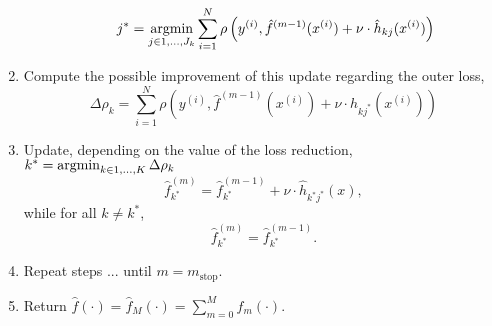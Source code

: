 \begin{algorithm}
\begin{enumerate}
\begin{itemize}
                \begin{equation}
                    j^*=\operatorname*{argmin}_{j\in 1,\ldots,J_k}\sum_{i=1}^N\rho\left(y^{(i)}, \hat{f}^{(m-1)}(x^{(i)}) + \nu \cdot \hat{h}_{kj}(x^{(i)}) \right)
                \end{equation}
        \end{itemize}
    \item Compute the possible improvement of this update regarding the outer loss,
        \begin{equation}
            \Delta\rho_k=\sum_{i=1}^N\rho\left(y^{(i)}, \hat{f}^{(m-1)}(x^{(i)}) + \nu \cdot \hat{h}_{kj^*}(x^{(i)}) \right)
        \end{equation}
    \item Update, depending on the value of the loss reduction, $k^*=\operatorname*{argmin}_{k\in1,\ldots,K}\Delta\rho_k$
        \begin{equation}
            \hat{f}^{(m)}_{k^*}=\hat{f}^{(m-1)}_{k^*}+\nu\cdot\hat{h}_{k^*j^*}(x),
        \end{equation}
        while for all $k\neq k^*$,
        \begin{equation}
            \hat{f}^{(m)}_{k^*}=\hat{f}^{(m-1)}_{k^*}.
        \end{equation}
    \item Repeat steps ... until $m=m_{\text{stop}}$.
    \item Return $\hat{f}(\cdot)=\hat{f}_M(\cdot)=\sum_{m=0}^Mf_m(\cdot)$.
\end{enumerate}
\end{algorithm}